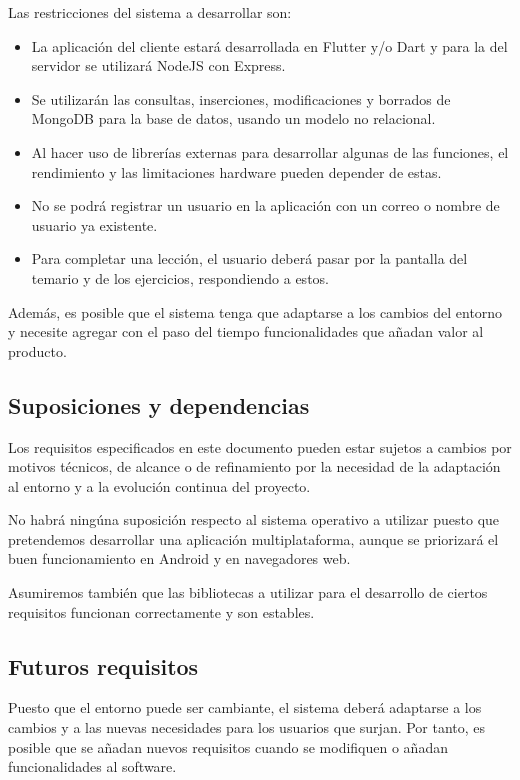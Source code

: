 Las restricciones del sistema a desarrollar son:
\begin{itemize}
    \item La aplicación del cliente estará desarrollada en Flutter y/o Dart y para la del servidor se utilizará NodeJS con Express.
    \item Se utilizarán las consultas, inserciones, modificaciones y borrados de MongoDB para la base de datos, usando un modelo no relacional.
    \item Al hacer uso de librerías externas para desarrollar algunas de las funciones, el rendimiento y las limitaciones hardware pueden depender de estas.
    \item No se podrá registrar un usuario en la aplicación con un correo o nombre de usuario ya existente.
    \item Para completar una lección, el usuario deberá pasar por la pantalla del temario y de los ejercicios, respondiendo a estos.
\end{itemize}


Además, es posible que el sistema tenga que adaptarse a los cambios del entorno y necesite agregar con el paso del tiempo funcionalidades que añadan valor
al producto.


\subsection{Suposiciones y dependencias}
Los requisitos especificados en este documento pueden estar sujetos a cambios por motivos técnicos, de alcance o de refinamiento por la necesidad de la adaptación
al entorno y a la evolución continua del proyecto.

No habrá ningúna suposición respecto al sistema operativo a utilizar puesto que pretendemos desarrollar una aplicación multiplataforma, aunque se priorizará el buen funcionamiento en Android y en navegadores web.

Asumiremos también que las bibliotecas a utilizar para el desarrollo de ciertos requisitos funcionan correctamente y son estables.

\subsection{Futuros requisitos}
Puesto que el entorno puede ser cambiante, el sistema deberá adaptarse a los cambios y a las nuevas necesidades para los usuarios que surjan.
Por tanto, es posible que se añadan nuevos requisitos cuando se modifiquen o añadan funcionalidades al software.

